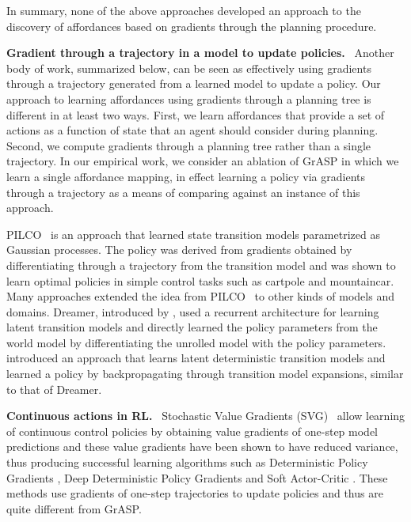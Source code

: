 \documentclass[nohyperref]{article}
\theoremstyle{plain}
\theoremstyle{definition}
\theoremstyle{remark}
\renewcommand{\paragraph}[1]{\textbf{#1}\ }
\begin{document}
In summary, none of the above approaches developed an approach to the discovery of affordances based on gradients through the planning procedure.

\paragraph{Gradient through a trajectory in a model to update policies.} 
Another  body of work, summarized below, can be seen as effectively using gradients through a trajectory generated from a learned model to update a policy. Our approach to learning affordances using gradients through a planning tree is different in at least two ways. First, we learn affordances that provide a set of actions as a function of state that an agent should consider during planning. Second, we compute gradients through a planning tree rather than a single trajectory. In our empirical work, we consider an ablation of {G}r{ASP} in which we learn a single affordance mapping, in effect learning a policy via gradients through a trajectory as a means of comparing against an instance of this approach. %

PILCO~\citep{deisenroth2011pilco} is an approach that learned state transition models parametrized as Gaussian processes. The policy was derived from gradients obtained by differentiating through a trajectory from the transition model and was shown to learn optimal policies in simple control tasks such as cartpole and mountaincar. Many approaches extended the idea from PILCO~\citep{gal2016improving,higuera2018synthesizing,chua2018deep,amos2018learning} to other kinds of models and domains. Dreamer, introduced by \citet{hafner2020dream}, used a recurrent architecture for learning latent transition models and directly learned the policy parameters from the world model by %
differentiating the unrolled model with the policy parameters.
\citet{byravan2020imagined} introduced an approach that learns latent deterministic transition models and learned a policy by backpropagating through transition model expansions, similar to that of Dreamer. 

\paragraph{Continuous actions in RL.}
Stochastic Value Gradients (SVG)~\citep{heess2015learning} allow learning of continuous control policies by obtaining value gradients of one-step model predictions and these value gradients have been shown to have reduced variance, thus producing successful learning algorithms such as Deterministic Policy Gradients %
\citep{silver2014deterministic}, Deep Deterministic Policy Gradients
\citep{casas2017deep} and Soft Actor-Critic
\citep{haarnoja2018soft}. These methods use gradients of one-step trajectories to update policies and thus are quite different from {G}r{ASP}.
\end{document}
